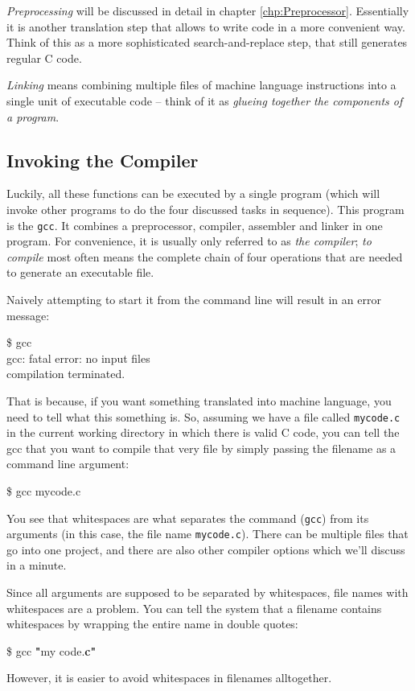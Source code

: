 \emph{Preprocessing} will be discussed in detail in chapter \ref{chp:Preprocessor}. Essentially it is another translation step that allows to write code in a more convenient way. Think of this as a more sophisticated search-and-replace step, that still generates regular C code.

\emph{Linking} means combining multiple files of machine language instructions into a single unit of executable code -- think of it as \emph{glueing together the components of a program}.

\subsection{Invoking the Compiler}
Luckily, all these functions can be executed by a single program (which will invoke other programs to do the four discussed tasks in sequence). This program is the \texttt{gcc}. It combines a preprocessor, compiler, assembler and linker in one program. For convenience, it is usually only referred to as \emph{the compiler}; \emph{to compile} most often means the complete chain of four operations that are needed to generate an executable file.

Naively attempting to start it from the command line will result in an error message:
\begin{cmdbox}
\$ gcc\\
gcc: {\color{red}fatal error}: no input files\\
compilation terminated.
\end{cmdbox}

That is because, if you want something translated into machine language, you need to tell what this something is. So, assuming we have a file called \texttt{mycode.c} in the current working directory in which there is valid C code, you can tell the gcc that you want to compile that very file by simply passing the filename as a command line argument:
\begin{cmdbox}
\$ gcc mycode.c
\end{cmdbox}

\begin{warnbox}
You see that whitespaces are what separates the command (\texttt{gcc}) from its arguments (in this case, the file name \texttt{mycode.c}). There can be multiple files that go into one project, and there are also other compiler options which we'll discuss in a minute.

Since all arguments are supposed to be separated by whitespaces, file names with whitespaces are a problem. You can tell the system that a filename contains whitespaces by wrapping the entire name in double quotes:
\begin{cmdbox}
\$ gcc \textbf{"}my code.\textbf{c"}
\end{cmdbox}

However, it is easier to avoid whitespaces in filenames alltogether.
\end{warnbox}

